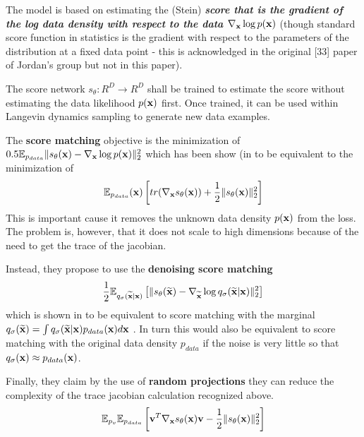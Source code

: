 The model is based on estimating the (Stein) \emph{\textbf{score that is the gradient of the log data density with respect to the data $\nabla_{{\mathbf{x}}} \log p({\mathbf{x}})$}} (though standard score function in statistics is the gradient with respect to the parameters of the distribution at a fixed data point - this is acknowledged in the original [33] paper of Jordan's group but not in this paper).

The score network $s_\theta: R^D \to R^D$ shall be trained to estimate the score without estimating the data likelihood $p({\mathbf{x}})$ first. Once trained, it can be used within Langevin dynamics sampling to generate new data examples.

The \textbf{score matching} objective is the minimization of $0.5 \mathbb{E}_{p_{data}} \Vert s_{\theta}({\mathbf{x}}) - \nabla_{{\mathbf{x}}} \log p({\mathbf{x}}) \Vert_2^2$ which has been show (in \cite{hyvarinen_estimation_2005} to be equivalent to the minimization of
\begin{align*}
\mathbb{E}_{p_{data}}({\mathbf{x}}) \left[ tr(\nabla_{\mathbf{x}} s_\theta({\mathbf{x}})) + \frac{1}{2} \Vert s_\theta({\mathbf{x}}) \Vert_2^2 \right]
\end{align*}
This is important cause it removes the unknown data density $p({\mathbf{x}})$ from the loss. The problem is, however, that it does not scale to high dimensions because of the need to get the trace of the jacobian. 

Instead, they propose to use the \textbf{denoising score matching}
\begin{align*}
\frac{1}{2} \mathbb{E}_{q_\sigma(\widetilde{{\mathbf{x}}}|{\mathbf{x}})} \left[ \Vert s_{\theta}(\widetilde{{\mathbf{x}}}) - \nabla_{\widetilde{{\mathbf{x}}}} \log q_\sigma(\widetilde{{\mathbf{x}}}|{\mathbf{x}}) \Vert_2^2 \right]
\end{align*}
which is shown in \cite{vincent_connection_2011} to be equivalent to score matching with the marginal
$q_\sigma(\widetilde{{\mathbf{x}}}) = \int q_\sigma(\widetilde{{\mathbf{x}}} | {\mathbf{x}}) p_{data}({\mathbf{x}}) d{\mathbf{x}}$ . In turn this would also be equivalent to score matching with the original data density $p_{data}$ if the noise is very little so that $q_\sigma({\mathbf{x}}) \approx p_{data}({\mathbf{x}})$.

Finally, they claim by the use of \textbf{random projections} they can reduce the complexity of the trace jacobian calculation recognized above.
\begin{align*}
\mathbb{E}_{p_v} \mathbb{E}_{p_{data}} \left[ {\mathbf{v}}^T \nabla_{\mathbf{x}} s_{\theta}({\mathbf{x}}) {\mathbf{v}} - \frac{1}{2} \Vert s_{\theta}({\mathbf{x}}) \Vert_2^2 \right]
\end{align*}

